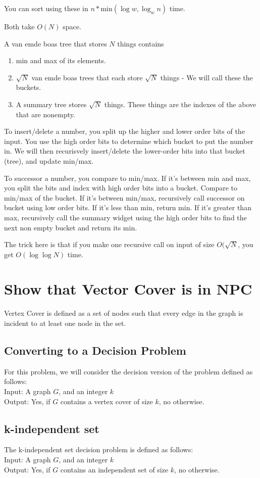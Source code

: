 \documentclass[10pt,twocolumn]{article}
\begin{document}
You can sort using these in $n * $min$(\log w, \log_{w}{n})$ time.

Both take $O(N)$ space.

A van emde boas tree that stores $N$ things contains
\begin{enumerate}
    \item min and max of its elements.
    \item $\sqrt{N}$ van emde boas trees that each store $\sqrt{N}$ things - We will call these the buckets.
    \item A summary tree stores $\sqrt{N}$ things. These things are the indexes of the above that are nonempty.
\end{enumerate}

To insert/delete a number, you split up the higher and lower order bits of the input. You use the high order bits to determine which bucket to put the number in. We will then recurisvely insert/delete the lower-order bits into that bucket (tree), and update min/max.

To successor a number, you compare to min/max. If it's between min and max, you split the bits and index with high order bits into a bucket. Compare to min/max of the bucket. If it's between min/max, recursively call successor on bucket using low order bits. If it's less than min, return min. If it's greater than max, recursively call the summary widget using the high order bits to find the next non empty bucket and return its min.

The trick here is that if you make one recursive call on input of size $O(\sqrt{N}$, you get $O(\log \log N)$ time.

\section{ Show that Vector Cover is in NPC }
Vertex Cover is defined as a set of nodes such that every edge in the graph is incident to at least one node in the set.
\subsection{Converting to a Decision Problem}
For this problem, we will consider the decision version of the problem defined as follows:\\
Input: A graph $G$, and an integer $k$\\
Output: Yes, if $G$ contains a vertex cover of size $k$, no otherwise.

\subsection{k-independent set}
The k-independent set decision problem is defined as follows:\\
Input: A graph $G$, and an integer $k$\\
Output: Yes, if $G$ contains an independent set of size $k$, no otherwise.\\
\end{document}
